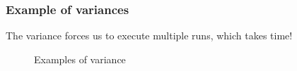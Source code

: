 \documentclass[11pt,english,compress]{beamer}
\begin{document}
\begin{frame}
	\frametitle{Example of variances}
	
	\begin{block}{}
		The variance forces us to execute multiple runs, which takes time!
	\end{block}
	
	\pause
	
	\begin{figure}%
		\centering
		\qquad
		\pause
		\caption{Examples of variance}%
	\end{figure}
\end{frame}

\end{document}
